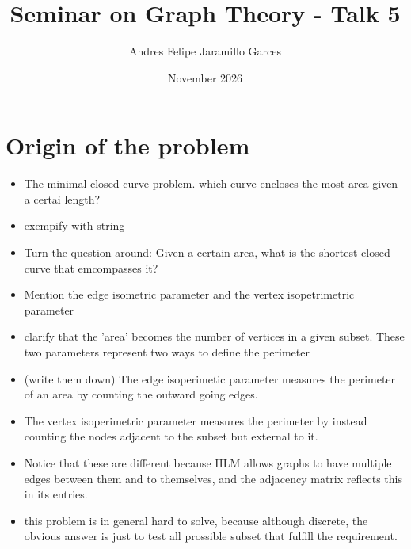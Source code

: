\documentclass{article}
\title{Seminar on Graph Theory - Talk 5}
\author{Andres Felipe Jaramillo Garces}
\date{November 2026}
\begin{document}
\maketitle
\section{Origin of the problem}
\cite[]{HLM1}
\begin{itemize}
  \item The minimal closed curve problem. which curve encloses the most area given a certai length?
  \item exempify with string
  \item Turn the question around: Given a certain area, what is the shortest closed curve that emcompasses it?
  \item Mention the edge isometric parameter and the vertex isopetrimetric parameter
  \item clarify that the 'area' becomes the number of vertices in a given subset. These two parameters represent two ways to define the perimeter
  \item (write them down) The edge isoperimetic parameter measures the perimeter of an area by counting the outward going edges.
  \item The vertex isoperimetric parameter measures the perimeter by instead counting the nodes adjacent to the subset but external to it. 
  \item Notice that these are different because HLM allows graphs to have multiple edges between them and to themselves, and the adjacency matrix reflects this in its entries.
  \item this problem is in general hard to solve, because although discrete, the obvious answer is just to test all prossible subset that fulfill the requirement.
\end{itemize}
\printbibliography
\end{document}
